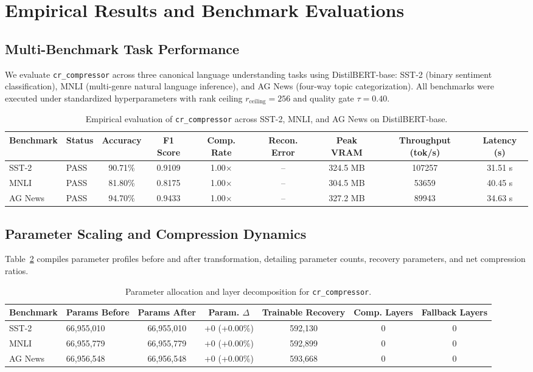 \section{Empirical Results and Benchmark Evaluations}
\label{sec:results}

\subsection{Multi-Benchmark Task Performance}
We evaluate \texttt{cr\_compressor} across three canonical language understanding tasks using DistilBERT-base: SST-2 (binary sentiment classification), MNLI (multi-genre natural language inference), and AG News (four-way topic categorization). All benchmarks were executed under standardized hyperparameters with rank ceiling $r_{\mathrm{ceiling}} = 256$ and quality gate $\tau = 0.40$.

\begin{table}[t]
\centering
\small
\begin{tabular}{llccccccc}
\toprule
\textbf{Benchmark} & \textbf{Status} & \textbf{Accuracy} & \textbf{F1 Score} & \textbf{Comp. Rate} & \textbf{Recon. Error} & \textbf{Peak VRAM} & \textbf{Throughput (tok/s)} & \textbf{Latency (s)} \\
\midrule
SST-2 & PASS & 90.71\% & 0.9109 & 1.00$\times$ & -- & 324.5 MB & 107257 & 31.51 s \\
MNLI & PASS & 81.80\% & 0.8175 & 1.00$\times$ & -- & 304.5 MB & 53659 & 40.45 s \\
AG News & PASS & 94.70\% & 0.9433 & 1.00$\times$ & -- & 327.2 MB & 89943 & 34.63 s \\
\bottomrule
\end{tabular}
\caption{Empirical evaluation of \texttt{cr\_compressor} across SST-2, MNLI, and AG News on DistilBERT-base.}
\label{tab:results_cr_compressor}
\end{table}

\subsection{Parameter Scaling and Compression Dynamics}
Table~\ref{tab:params_cr_compressor} compiles parameter profiles before and after transformation, detailing parameter counts, recovery parameters, and net compression ratios.

\begin{table}[t]
\centering
\small
\begin{tabular}{llccccc}
\toprule
\textbf{Benchmark} & \textbf{Params Before} & \textbf{Params After} & \textbf{Param. $\Delta$} & \textbf{Trainable Recovery} & \textbf{Comp. Layers} & \textbf{Fallback Layers} \\
\midrule
SST-2 & 66,955,010 & 66,955,010 & +0 (+0.00\%) & 592,130 & 0 & 0 \\
MNLI & 66,955,779 & 66,955,779 & +0 (+0.00\%) & 592,899 & 0 & 0 \\
AG News & 66,956,548 & 66,956,548 & +0 (+0.00\%) & 593,668 & 0 & 0 \\
\bottomrule
\end{tabular}
\caption{Parameter allocation and layer decomposition for \texttt{cr\_compressor}.}
\label{tab:params_cr_compressor}
\end{table}

